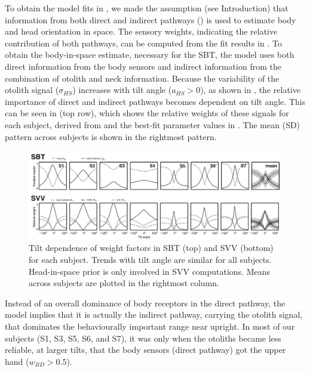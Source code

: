 To obtain the model fits in , we made the assumption (see Introduction) that information from both direct and indirect pathways () is used to estimate body and head orientation in space. The sensory weights, indicating the relative contribution of both pathways, can be computed from the fit results in . To obtain the body-in-space estimate, necessary for the SBT, the model uses both direct information from the body sensors and indirect information from the combination of otolith and neck information. Because the variability of the otolith signal ($\sigma_{HS}$) increases with tilt angle ($a_{HS} > 0$), as shown in , the relative importance of direct and indirect pathways becomes dependent on tilt angle. This can be seen in  (top row), which shows the relative weights of these signals for each subject, derived from  and the best-fit parameter values in . The mean (\textpm SD) pattern across subjects is shown in the rightmost pattern. 

\begin{figure}
    \includegraphics[width=1.0\textwidth]{src/paper1/figure5.pdf}
    
    \caption{Tilt dependence of weight factors in SBT (top) and SVV (bottom) for each subject. Trends with tilt angle are similar for all subjects. Head-in-space prior is only involved in SVV computations. Means across subjects are plotted in the rightmost column.}
    \label{p1:fig5}
\end{figure}

Instead of an overall dominance of body receptors in the direct pathway, the model implies that it is actually the indirect pathway, carrying the otolith signal, that dominates the behaviourally important range near upright. In most of our subjects (S1, S3, S5, S6, and S7), it was only when the otoliths became less reliable, at larger tilts, that the body sensors (direct pathway) got the upper hand ($w_{BD} > 0.5$). 

